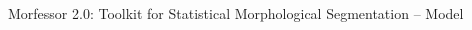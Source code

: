 \documentclass[final]{beamer} %
\DeclareMathOperator*{\argmin}{arg\,min}
\newcommand{\seq}[1]{\boldsymbol{#1}}
\newcommand{\params}{\boldsymbol{\theta}}
\newcommand{\data}{\seq{D}}
\newcommand{\hatdata}{\seq{\hat{D}}}
\newcommand{\token}{\phi}
\begin{document}
\begin{frame}{Morfessor 2.0: Toolkit for Statistical Morphological Segmentation -- Model}
\begin{columns}
\begin{column}{.3\textwidth}
%
%            
%
%
%
%
%






\end{column}
\end{columns}
\end{frame}
\end{document}
